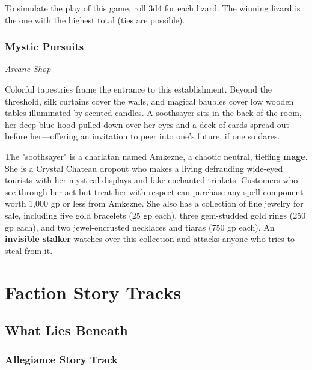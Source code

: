 \documentclass[letterpaper, 11pt, bg=full, twocolumn]{dndbook}
\begin{document}
To simulate the play of this game, roll 3d4 for each lizard. The winning lizard is the one with the highest total (ties are possible).

\subsubsection{Mystic Pursuits}

\textit{Arcane Shop}

Colorful tapestries frame the entrance to this establishment. Beyond the threshold, silk curtains cover the walls, and magical baubles cover low wooden tables illuminated by scented candles. A soothsayer sits in the back of the room, her deep blue hood pulled down over her eyes and a deck of cards spread out before her---offering an invitation to peer into one's future, if one so dares.

The "soothsayer" is a charlatan named Amkezne, a chaotic neutral, tiefling \textbf{mage}. She is a Crystal Chateau dropout who makes a living defrauding wide-eyed tourists with her mystical displays and fake enchanted trinkets. Customers who see through her act but treat her with respect can purchase any spell component worth 1,000 gp or less from Amkezne. She also has a collection of fine jewelry for sale, including five gold bracelets (25 gp each), three gem-studded gold rings (250 gp each), and two jewel-encrusted necklaces and tiaras (750 gp each). An \textbf{invisible stalker} watches over this collection and attacks anyone who tries to steal from it.

\section{Faction Story Tracks}


\subsection{What Lies Beneath}

\subsubsection{Allegiance Story Track}
\end{document}

